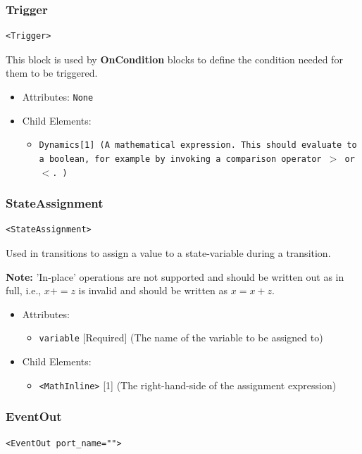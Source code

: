 \documentclass{article}
\newcommand{\note}[1]{%
\begin{center}
\colorbox{issuecolor}{\parbox{0.8\linewidth}{\textbf{Note:} #1}}
\end{center}%
}
\newcommand{\MathInline}{\tt{Dynamics}}
\newcommand{\OnCondition}{{\bf{OnCondition}}\xspace}
\begin{document}
\subsubsection{Trigger}
%
\begin{lstlisting}
<Trigger>
\end{lstlisting}

This block is used by \OnCondition blocks to define the condition needed for
them to be triggered.

\begin{itemize}
\item Attributes: \texttt{None}

\item Child Elements:
%
\begin{itemize}
\item \MathInline {[}1{]} (A mathematical expression. This should evaluate to a
boolean, for example by invoking a comparison operator  $>$ or $<$. )
\end{itemize}
\end{itemize}

\subsubsection{StateAssignment}
%
\begin{lstlisting}
<StateAssignment>
\end{lstlisting}

Used in transitions to assign a value to a state-variable during a transition.

\note{'In-place' operations are not supported and should be written out as in
full,
i.e., $x+=z$ is invalid and should be written as $x=x+z$.}

\begin{itemize}
\item Attributes:
%
\begin{itemize}
\item \verb|variable| {[}Required{]} (The name of the variable to be assigned
to)
\end{itemize}

\item Child Elements:
%
\begin{itemize}
\item \verb|<MathInline>| {[}1{]} (The right-hand-side of the assignment
expression)
\end{itemize}
\end{itemize}

\subsubsection{EventOut}
%
\begin{lstlisting}
<EventOut port_name="">
\end{lstlisting}
\end{document}
